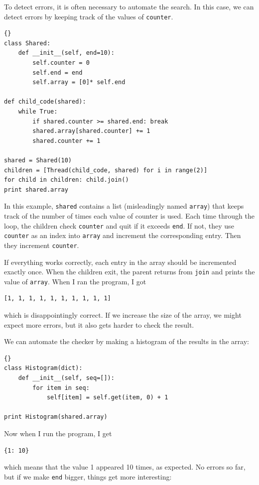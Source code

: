 \documentclass{book}
\begin{document}
To detect errors, it is often necessary to automate the search.
In this case, we can detect errors by keeping track of the values
of {\tt counter}.

\begin{lstlisting}[caption={}]{}
class Shared:
    def __init__(self, end=10):
        self.counter = 0
        self.end = end
        self.array = [0]* self.end

def child_code(shared):
    while True:
        if shared.counter >= shared.end: break
        shared.array[shared.counter] += 1
        shared.counter += 1

shared = Shared(10)
children = [Thread(child_code, shared) for i in range(2)]
for child in children: child.join()
print shared.array
\end{lstlisting}

In this example, {\tt shared} contains a list (misleadingly
named {\tt array}) that keeps track of the number of times
each value of counter is used.
Each time through the loop, the children check {\tt counter}
and quit if it exceeds {\tt end}.  If not, they use {\tt counter}
as an index into {\tt array} and increment the corresponding
entry.  Then they increment {\tt counter}.

If everything works correctly, each entry in the array should
be incremented exactly once.  When the children exit, the parent
returns from {\tt join} and prints the value of {\tt array}.
When I ran the program, I got
%
\begin{verbatim}
[1, 1, 1, 1, 1, 1, 1, 1, 1, 1]
\end{verbatim}
%
which is disappointingly correct.  If we increase the size of
the array, we might expect more errors, but it also gets harder
to check the result.

\newpage
We can automate the checker by making
a histogram of the results in the array:

\begin{lstlisting}[caption={}]{}
class Histogram(dict):
    def __init__(self, seq=[]):
        for item in seq:
            self[item] = self.get(item, 0) + 1

print Histogram(shared.array)
\end{lstlisting}

Now when I run the program, I get

\begin{verbatim}
{1: 10}
\end{verbatim}
%
which means that the value 1 appeared 10 times, as expected.  No
errors so far, but if we make {\tt end} bigger, things get more
interesting:
\end{document}
